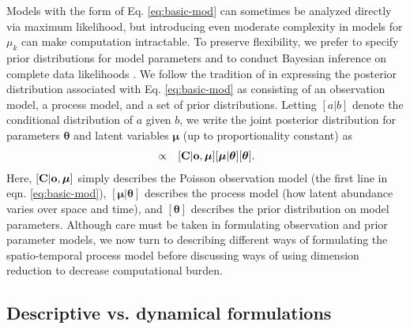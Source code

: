 \documentclass[12pt,english]{article}
\begin{document}
\begin{spacing}{1.9}
Models with the form of Eq. \ref{eq:basic-mod} can sometimes be analyzed directly via maximum likelihood, but introducing even moderate complexity in models for $\mu_k$ can make computation intractable.  To preserve flexibility, we prefer to specify prior distributions for model parameters and to conduct Bayesian inference \citep[see e.g.,][]{GelmanEtAl2004} on complete data likelihoods \citep{Dempster1977}.   We follow the tradition of \citet{Berliner1996} in expressing the posterior distribution associated with Eq. \ref{eq:basic-mod} as consisting of an observation model, a process model, and a set of
prior distributions.  Letting $[a|b]$ denote the conditional distribution of $a$ given $b$, we write the joint posterior distribution for parameters $\boldsymbol{\theta}$ and latent variables $\boldsymbol{\mu}$ (up to proportionality constant) as
\begin{eqnarray}
  [\boldsymbol{\mu},\boldsymbol{\theta} | {\bf C},{\bf o}] & \propto & [{\bf C} | {\bf o}, \boldsymbol{\mu}] [\boldsymbol{\mu} | \boldsymbol{\theta}] [\boldsymbol{\theta}].
  \label{eq:hmod}
\end{eqnarray}
Here, $[{\bf C} | {\bf o}, \boldsymbol{\mu}]$ simply describes the Poisson observation model (the first line in eqn. \ref{eq:basic-mod}), $[\boldsymbol{\mu} | \boldsymbol{\theta}]$ describes the process model (how latent abundance varies over space and time), and $[\boldsymbol{\theta}]$ describes the prior distribution on model parameters.  Although care must be taken in formulating observation and prior parameter models, we now turn to describing different ways of formulating the spatio-temporal process model before discussing ways of using dimension reduction to decrease computational burden.

\subsection{Descriptive vs. dynamical formulations}


\end{spacing}
\end{document}
